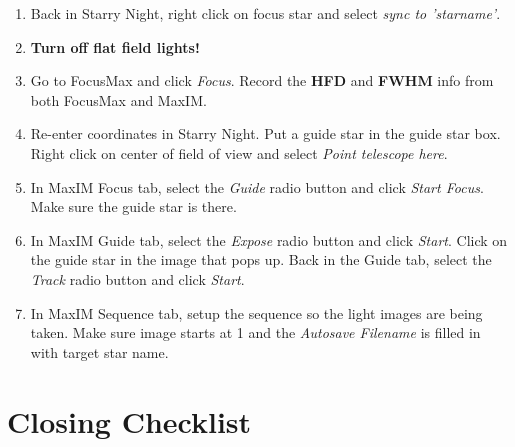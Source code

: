 \documentclass[11pt]{report}
\begin{document}
\begin{enumerate}
\item Back in Starry Night, right click on focus star and select \emph{sync to 'starname'}.
\item {\bf Turn off flat field lights!}
\item Go to FocusMax and click \emph{Focus}. Record the {\bf HFD} and {\bf FWHM} info from both FocusMax and MaxIM.
\item Re-enter coordinates in Starry Night. Put a guide star in the guide star box. Right click on center of field of view and select \emph{Point telescope here}.
\item In MaxIM Focus tab, select the \emph{Guide} radio button and click \emph{Start Focus}. Make sure the guide star is there.
\item In MaxIM Guide tab, select the \emph{Expose} radio button and click \emph{Start}. Click on the guide star in the image that pops up. Back in the Guide tab, select the \emph{Track} radio button and click \emph{Start}. 
\item In MaxIM Sequence tab, setup the sequence so the light images are being taken. Make sure image starts at 1 and the \emph{Autosave Filename} is filled in with target star name. 
\end{enumerate}

\chapter{Closing Checklist}
\end{document}
